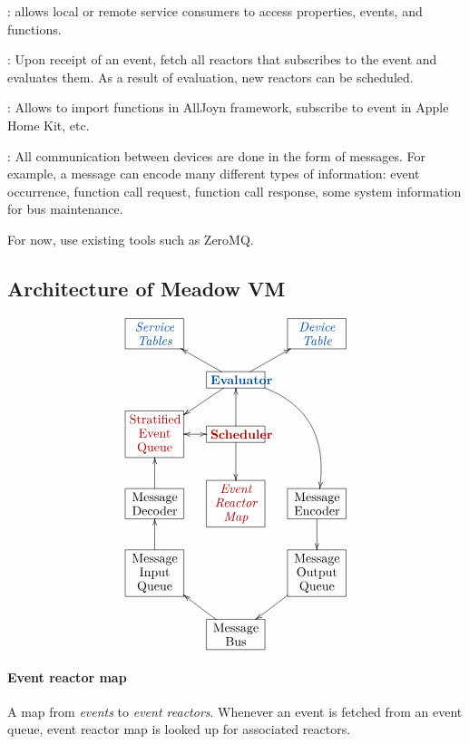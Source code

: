 \documentclass{note}
\begin{document}
{\w \textcolor{blue2}{}: allows local or
   remote service consumers to access properties, 
   events, and functions.

\w \textcolor{blue2}{}: 
   Upon receipt of an event, fetch all reactors that subscribes to the
   event and evaluates them. As a result of evaluation, new reactors can
   be scheduled.

\w \textcolor{blue2}{}:
   Allows to import functions in AllJoyn framework, subscribe to event in
   Apple Home Kit, etc.

\w \textcolor{blue2}{}: 
   All communication between devices are done in the form of messages.
   For example, a message can encode many different types of information:
   event occurrence, function call request, function call response, 
   some system information for bus maintenance.

   For now, use existing tools such as \textcolor{blue2}{ZeroMQ}.
\eit

\subsection{Architecture of Meadow VM}
\[\xymatrix@-0.5pc{
 & *+[F]\txt<1.4cm>{\textcolor{blue2}{\em{}Service Tables}} &&
  *+[F]\txt<1.4cm>{\textcolor{blue2}{\em{}Device Table}}\\
 & & *+[F]\txt<1.4cm>{\textcolor{blue2}{\bf{}Evaluator}}\ar[ld]\ar[lu]\ar[ru]\ar@/^7ex/[rdd]\\
  & *+[F]\txt<1.4cm>{\textcolor{red2}{Stratified Event
  Queue}} & *+[F]\txt<1.4cm>{\textcolor{red2}{\bf{}Scheduler}} \ar@{<->}[l]\ar[u]
\ar[d]& \\
&*+[F]\txt<1.4cm>{Message Decoder} \ar[u]&*+[F]\txt<1.4cm>{\textcolor{red2}{\em Event Reactor Map}}
&*+[F]\txt<1.4cm>{Message Encoder} \ar[d]&\\
&  *+[F]\txt<1.4cm>{Message Input Queue}\ar[u] && *+[F]\txt<1.4cm>{Message Output
    Queue} \\
& &  *+[F]\txt<1.4cm>{Message Bus} \ar[ul]\ar@{<-}[ru]
}\]

\paragraph{Event reactor map} A map from {\em events\/} to {\em event
  reactors\/}.  Whenever an event is fetched from an event queue, 
event reactor map is looked up for associated reactors. 


}
\end{document}
